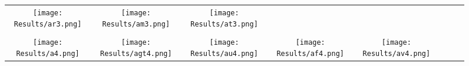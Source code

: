 \documentclass[journal]{IEEEtran}
\begin{document}
\begin{figure*}[!t]
\begin{tabular}{cccccccc}
		\hspace{0.4cm}
		\begin{minipage}{30pt}
			\texttt{[image: Results/ar3.png]}
\end{minipage}
		&
		\hspace{0.4cm}
		\begin{minipage}{30pt}
			\texttt{[image: Results/am3.png]}
\end{minipage}
		&
		\hspace{0.4cm}
		\begin{minipage}{30pt}
			\texttt{[image: Results/at3.png]}
\end{minipage}
		\\
		\\
		\begin{minipage}{30pt}
			\texttt{[image: Results/a4.png]}
\end{minipage}
		&
		\hspace{0.4cm}
		\begin{minipage}{30pt}
			\texttt{[image: Results/agt4.png]}
\end{minipage}
		&
		\hspace{0.4cm}
		\begin{minipage}{30pt}
			\texttt{[image: Results/au4.png]}
\end{minipage}
		&
		\hspace{0.4cm}
		\begin{minipage}{30pt}
			\texttt{[image: Results/af4.png]}
\end{minipage}
		&
		\hspace{0.4cm}
		\begin{minipage}{30pt}
			\texttt{[image: Results/av4.png]}
\end{minipage}
	

\end{tabular}
\end{figure*}
\end{document}
